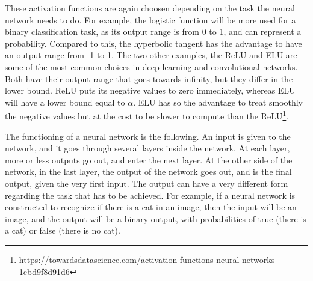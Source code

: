 These activation functions are again choosen depending on the task the neural network needs to do. For example, the logistic function will be more used for a binary classification task, as its output range is from 0 to 1, and can represent a probability. Compared to this, the hyperbolic tangent has the advantage to have an output range from -1 to 1. The two other examples, the ReLU and ELU are some of the most common choices in deep learning and convolutional networks. Both have their output range that goes towards infinity, but they differ in the lower bound. ReLU puts its negative values to zero immediately, whereas ELU will have a lower bound equal to $\alpha$. ELU has so the advantage to treat smoothly the negative values but at the cost to be slower to compute than the ReLU\footnote{\url{https://towardsdatascience.com/activation-functions-neural-networks-1cbd9f8d91d6}}.

The functioning of a neural network is the following. An input is given to the network, and it goes through several layers inside the network. At each layer, more or less outputs go out, and enter the next layer. At the other side of the network, in the last layer, the output of the network goes out, and is the final output, given the very first input. The output can have a very different form regarding the task that has to be achieved. For example, if a neural network is constructed to recognize if there is a cat in an image, then the input will be an image, and the output will be a binary output, with probabilities of true (there is a cat) or false (there is no cat).

